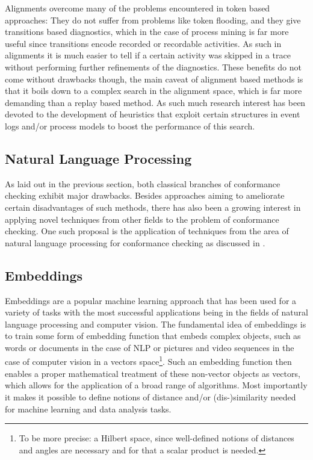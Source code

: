 \documentclass[runningheads]{template/llncs}
\begin{document}

Alignments overcome many of the problems encountered in token based approaches: 
They do not suffer from problems like token flooding, and they give transitions based diagnostics, which in the case of process mining is far more useful since transitions encode recorded or recordable activities. 
As such in alignments it is much easier to tell if a certain activity was skipped in a trace without performing further refinements of the diagnostics.
These benefits do not come without drawbacks though, the main caveat of alignment based methods is that it boils down to a complex search in the alignment space, which is far more demanding than a replay based method.
As such much research interest has been devoted to the development of heuristics that exploit certain  structures in event logs and/or process models to boost the performance of this search.

\subsection{Natural Language Processing}

As laid out in the previous section, both classical branches of conformance checking exhibit major drawbacks.
Besides approaches aiming to ameliorate certain disadvantages of such methods, there has also been a growing interest in applying novel techniques from other fields to the problem of conformance checking.
One such proposal is the application of techniques from the area of natural language processing for conformance checking as discussed in \cite{PBWe20}.

\subsection{Embeddings}
Embeddings are a popular machine learning approach that has been used for a variety of tasks with the most successful applications being in the fields of natural language processing and computer vision.
The fundamental idea of embeddings is to train some form of embedding function that embeds complex objects, such as words or documents in the case of NLP or pictures and video sequences in the case of computer vision in a vectors space\footnote{To be more precise: a Hilbert space, since well-defined notions of distances and angles are necessary and for that a scalar product  is needed.}.
Such an embedding function then enables a proper mathematical treatment of these non-vector objects as vectors, which allows for the application of a broad range of algorithms.
Most importantly it makes it possible to define notions of distance and/or (dis-)similarity needed for machine learning and data analysis tasks.
\end{document}
